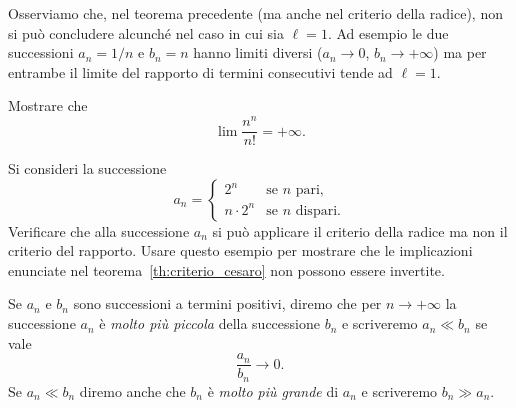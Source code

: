 Osserviamo che, nel teorema precedente (ma anche nel criterio della radice),
non si può concludere alcunché nel
caso in cui sia $\ell = 1$.
Ad esempio le due successioni $a_n = 1/n$ e $b_n = n$
hanno limiti diversi ($a_n \to 0$, $b_n\to +\infty$) ma per entrambe
il limite del rapporto di termini consecutivi tende ad $\ell=1$.

\begin{exercise}
Mostrare che
\[
  \lim \frac{n^n}{n!} = +\infty.
\]
\end{exercise}

\begin{exercise}
Si consideri la successione
\[
a_n =
\begin{cases}
   2^n &\text{se $n$ pari},\\
   n\cdot 2^n &\text{se $n$ dispari}.
\end{cases}
\]
Verificare che alla successione $a_n$
si può applicare il criterio della radice ma
non il criterio del rapporto.
Usare questo esempio per mostrare che le implicazioni
enunciate nel teorema~\ref{th:criterio_cesaro} non
possono essere invertite.
\end{exercise}

\begin{definition}
\mymark{***}
Se $a_n$ e $b_n$ sono successioni a termini positivi, diremo che
per $n\to +\infty$ la successione $a_n$ è \emph{molto più piccola}
della successione $b_n$ e scriveremo $a_n \ll b_n$ se vale
\mymargin{$\ll$}
\[
\frac{a_n}{b_n} \to 0.
\]
Se $a_n \ll b_n$ diremo anche che $b_n$ è \emph{molto più grande}
di $a_n$ e scriveremo $b_n \gg a_n$.
\mymargin{$\gg$}
\end{definition}

